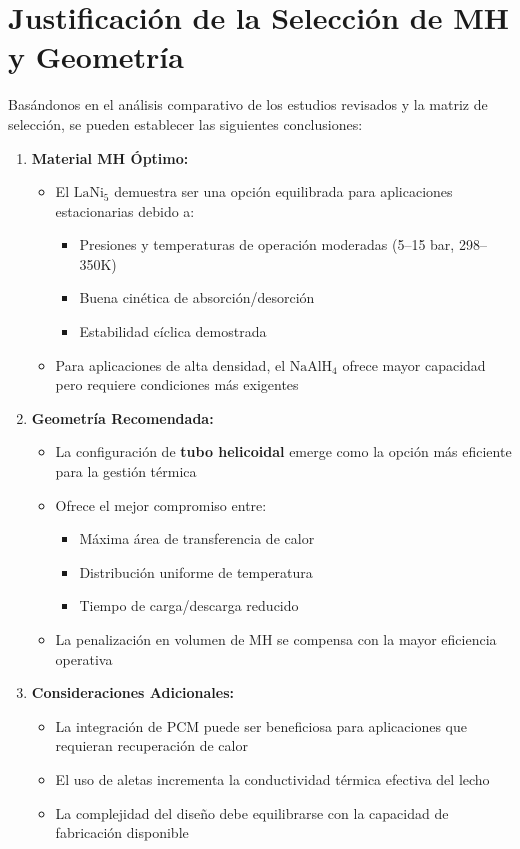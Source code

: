 \documentclass{article}
\begin{document}
\FloatBarrier

\section{Justificación de la Selección de MH y Geometría}

Basándonos en el análisis comparativo de los estudios revisados y la matriz de selección, se pueden establecer las siguientes conclusiones:

\begin{enumerate}
\item \textbf{Material MH Óptimo:}
    \begin{itemize}
    \item El $\text{LaNi}_5$ demuestra ser una opción equilibrada para aplicaciones estacionarias debido a:
        \begin{itemize}
        \item Presiones y temperaturas de operación moderadas (5--15 bar, 298--350K)
        \item Buena cinética de absorción/desorción
        \item Estabilidad cíclica demostrada
        \end{itemize}
    \item Para aplicaciones de alta densidad, el $\text{NaAlH}_4$ ofrece mayor capacidad pero requiere condiciones más exigentes
    \end{itemize}

\item \textbf{Geometría Recomendada:}
    \begin{itemize}
    \item La configuración de \textbf{tubo helicoidal} emerge como la opción más eficiente para la gestión térmica
    \item Ofrece el mejor compromiso entre:
        \begin{itemize}
        \item Máxima área de transferencia de calor
        \item Distribución uniforme de temperatura
        \item Tiempo de carga/descarga reducido
        \end{itemize}
    \item La penalización en volumen de MH se compensa con la mayor eficiencia operativa
    \end{itemize}

\item \textbf{Consideraciones Adicionales:}
    \begin{itemize}
    \item La integración de PCM puede ser beneficiosa para aplicaciones que requieran recuperación de calor
    \item El uso de aletas incrementa la conductividad térmica efectiva del lecho
    \item La complejidad del diseño debe equilibrarse con la capacidad de fabricación disponible
    \end{itemize}
\end{enumerate}
\end{document}
